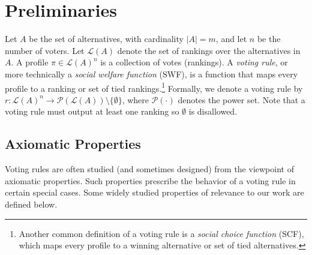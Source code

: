 \documentclass[prodmode]{acmsmall-ec14}
\newcommand{\calL}{{\mathcal{L}}}
\newcommand{\rank}{{\calL(A)}}
\newcommand{\calP}{{\mathcal{P}}}
\begin{document}
\section{Preliminaries}
\label{sec:prelim}
Let $A$ be the set of alternatives, with cardinality $|A| = m$, and let $n$ be the number of voters. Let $\rank$ denote the set of rankings over the alternatives in $A$. A profile $\pi \in \rank^n$ is a collection of votes (rankings). A \emph{voting rule}, or more technically a \emph{social welfare function} (SWF), is a function that maps every profile to a ranking or set of tied rankings.\footnote{Another common definition of a voting rule is a \emph{social choice function} (SCF), which maps every profile to a winning alternative or set of tied alternatives.} Formally, we denote a voting rule by $r : \rank^n \rightarrow \calP(\rank)\setminus\{\emptyset\}$, where $\calP(\cdot)$ denotes the power set. Note that a voting rule must output at least one ranking so $\emptyset$ is disallowed. 


\subsection*{Axiomatic Properties} Voting rules are often studied (and sometimes designed) from the viewpoint of axiomatic properties. Such properties prescribe the behavior of a voting rule in certain special cases. Some widely studied properties of relevance to our work are defined below. 
\end{document}
